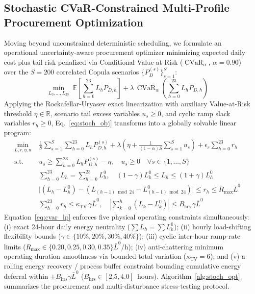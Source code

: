 \documentclass[journal,10pt,twocolumn]{IEEEtran}
\begin{document}
\subsection{Stochastic CVaR-Constrained Multi-Profile Procurement Optimization}
Moving beyond unconstrained deterministic scheduling, we formulate an operational uncertainty-aware procurement optimizer minimizing expected daily cost plus tail risk penalized via Conditional Value-at-Risk ($\operatorname{CVaR}_{\alpha}$, $\alpha = 0.90$) over the $S=200$ correlated Copula scenarios $\{P_D^{(s)}\}_{s=1}^{S}$:
\begin{equation}
\min_{L_0, \dots, L_{23}} \; \mathbb{E}\!\left[\sum_{h=0}^{23} L_h P_{D,h}\right] + \lambda \, \operatorname{CVaR}_{\alpha}\!\left(\sum_{h=0}^{23} L_h P_{D,h}\right)
\label{eq:stoch_obj}
\end{equation}
Applying the Rockafellar-Uryasev exact linearization \cite{rockafellar2000optimization} with auxiliary Value-at-Risk threshold $\eta \in \mathbb{R}$, scenario tail excess variables $u_s \ge 0$, and cyclic ramp slack variables $r_h \ge 0$, Eq.~\ref{eq:stoch_obj} transforms into a globally solvable linear program:
\begin{equation}
\begin{aligned}
\min_{L, r, \eta, u} \; & \frac{1}{S}\sum_{s=1}^{S}\sum_{h=0}^{23} L_h P_{D,h}^{(s)} + \lambda\!\left(\eta + \frac{1}{(1-\alpha)S}\sum_{s=1}^{S} u_s\right) + \epsilon_r \sum_{h=0}^{23} r_h \\
\text{s.t.} \; & u_s \ge \sum_{h=0}^{23} L_h P_{D,h}^{(s)} - \eta, \quad u_s \ge 0 \quad \forall s \in \{1,\dots,S\} \\
& \sum_{h=0}^{23} L_h = \sum_{h=0}^{23} L_h^0, \quad (1-\gamma)L_h^0 \le L_h \le (1+\gamma)L_h^0 \\
& \big|(L_h - L_h^0) - (L_{(h-1)\bmod 24} - L_{(h-1)\bmod 24}^0)\big| \le r_h \le R_{\max}\bar{L}^0 \\
& \sum_{h=0}^{23} r_h \le \kappa_{\text{TV}}\,\gamma\bar{L}^0, \quad \left|\sum_{k=0}^{h}(L_k - L_k^0)\right| \le B_{\text{hrs}}\,\gamma\bar{L}^0
\end{aligned}
\label{eq:cvar_lp}
\end{equation}
Equation~\ref{eq:cvar_lp} enforces five physical operating constraints simultaneously: (i) exact 24-hour daily energy neutrality ($\sum L_h = \sum L_h^0$); (ii) hourly load-shifting flexibility bounds ($\gamma \in \{10\%, 20\%, 30\%, 40\%\}$); (iii) cyclic inter-hour ramp-rate limits ($R_{\max} \in \{0.20, 0.25, 0.30, 0.35\}\bar{L}^0$/h); (iv) anti-chattering minimum operating duration smoothness via bounded total variation ($\kappa_{\text{TV}} = 6$); and (v) a rolling energy recovery / process buffer constraint bounding cumulative energy deferral within $\pm B_{\text{hrs}}\gamma\bar{L}^0$ ($B_{\text{hrs}} \in [2.5, 4.0]$~hours). Algorithm~\ref{alg:stoch_opt} summarizes the procurement and multi-disturbance stress-testing protocol.
\end{document}
